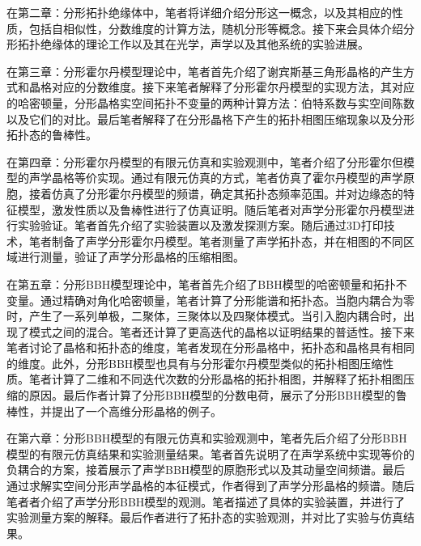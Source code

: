 在第二章：分形拓扑绝缘体中，笔者将详细介绍分形这一概念，以及其相应的性质，包括自相似性，分数维度的计算方法，随机分形等概念。接下来会具体介绍分形拓扑绝缘体的理论工作以及其在光学，声学以及其他系统的实验进展。

在第三章：分形霍尔丹模型理论中，笔者首先介绍了谢宾斯基三角形晶格的产生方式和晶格对应的分数维度。接下来笔者解释了分形霍尔丹模型的实现方法，其对应的哈密顿量，分形晶格实空间拓扑不变量的两种计算方法：伯特系数与实空间陈数以及它们的对比。最后笔者解释了在分形晶格下产生的拓扑相图压缩现象以及分形拓扑态的鲁棒性。

在第四章：分形霍尔丹模型的有限元仿真和实验观测中，笔者介绍了分形霍尔但模型的声学晶格等价实现。通过有限元仿真的方式，笔者仿真了霍尔丹模型的声学原胞，接着仿真了分形霍尔丹模型的频谱，确定其拓扑态频率范围。并对边缘态的特征模型，激发性质以及鲁棒性进行了仿真证明。随后笔者对声学分形霍尔丹模型进行实验验证。笔者首先介绍了实验装置以及激发探测方案。随后通过3D打印技术，笔者制备了声学分形霍尔丹模型。笔者测量了声学拓扑态，并在相图的不同区域进行测量，验证了声学分形晶格的压缩相图。

在第五章：分形BBH模型理论中，笔者首先介绍了BBH模型的哈密顿量和拓扑不变量。通过精确对角化哈密顿量，笔者计算了分形能谱和拓扑态。当胞内耦合为零时，产生了一系列单极，二聚体，三聚体以及四聚体模式。当引入胞内耦合时，出现了模式之间的混合。笔者还计算了更高迭代的晶格以证明结果的普适性。接下来笔者讨论了晶格和拓扑态的维度，笔者发现在分形晶格中，拓扑态和晶格具有相同的维度。此外，分形BBH模型也具有与分形霍尔丹模型类似的拓扑相图压缩性质。笔者计算了二维和不同迭代次数的分形晶格的拓扑相图，并解释了拓扑相图压缩的原因。最后作者计算了分形BBH模型的分数电荷，展示了分形BBH模型的鲁棒性，并提出了一个高维分形晶格的例子。

在第六章：分形BBH模型的有限元仿真和实验观测中，笔者先后介绍了分形BBH模型的有限元仿真结果和实验测量结果。笔者首先说明了在声学系统中实现等价的负耦合的方案，接着展示了声学BBH模型的原胞形式以及其动量空间频谱。最后通过求解实空间分形声学晶格的本征模式，作者得到了声学分形晶格的频谱。随后笔者者介绍了声学分形BBH模型的观测。笔者描述了具体的实验装置，并进行了实验测量方案的解释。最后作者进行了拓扑态的实验观测，并对比了实验与仿真结果。